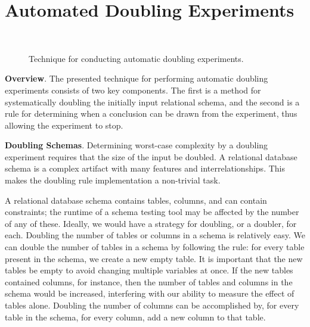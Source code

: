 
\vspace*{-.035in}
\section{Automated Doubling Experiments}\label{sec:technique}
\vspace*{-.035in}

  \begin{figure*}
    
    \caption{Technique for conducting automatic doubling experiments.}~\label{fig:doublingexp}
  \end{figure*}


  {\bf Overview}. The presented technique for performing automatic doubling experiments consists of two key components.
  The first is a method for systematically doubling the initially input relational schema, and the second is a rule for
  determining when a conclusion can be drawn from the experiment, thus allowing the experiment to stop.

  \textbf{Doubling Schemas}. Determining worst-case complexity by a doubling experiment requires that the size of the
  input be doubled. A relational database schema is a complex artifact with many features and interrelationships.  This
  makes the doubling rule implementation a non-trivial task.


  A relational database schema contains tables, columns, and can contain constraints; the runtime of a schema testing
  tool may be affected by the number of any of these. Ideally, we would have a strategy for doubling, or a doubler, for
  each. Doubling the number of tables or columns in a schema is relatively easy.  We can double the number of tables in
  a schema by following the rule: for every table present in the schema, we create a new empty table. It is important
  that the new tables be empty to avoid changing multiple variables at once.  If the new tables contained columns, for
  instance, then the number of tables and columns in the schema would be increased, interfering with our ability to
  measure the effect of tables alone.  Doubling the number of columns can be accomplished by, for every table in the
  schema, for every column, add a new column to that table.

